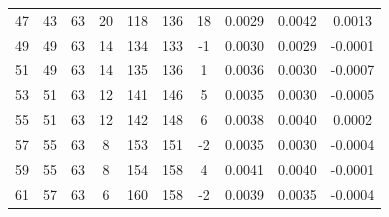 \begin{table}[t]
\begin{tabular}{cccccccccc}
47 & 43 & 63 & 20 & 118 & 136 & 18 & 0.0029 & 0.0042 & 0.0013 \\
49 & 49 & 63 & 14 & 134 & 133 & -1 & 0.0030 & 0.0029 & -0.0001 \\
51 & 49 & 63 & 14 & 135 & 136 & 1 & 0.0036 & 0.0030 & -0.0007 \\
53 & 51 & 63 & 12 & 141 & 146 & 5 & 0.0035 & 0.0030 & -0.0005 \\
55 & 51 & 63 & 12 & 142 & 148 & 6 & 0.0038 & 0.0040 & 0.0002 \\
57 & 55 & 63 & 8 & 153 & 151 & -2 & 0.0035 & 0.0030 & -0.0004 \\
59 & 55 & 63 & 8 & 154 & 158 & 4 & 0.0041 & 0.0040 & -0.0001 \\
61 & 57 & 63 & 6 & 160 & 158 & -2 & 0.0039 & 0.0035 & -0.0004 \\
\hline
\end{tabular}
\end{table}

